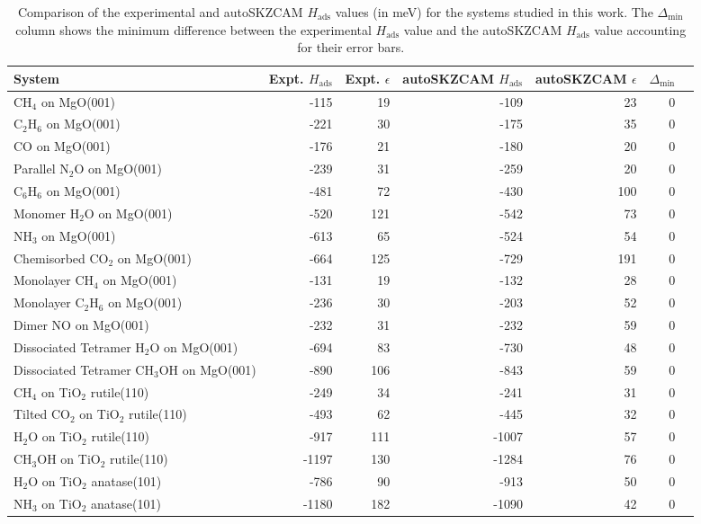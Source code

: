 \begin{table}
\caption{\label{tab:hads_comparison}Comparison of the experimental and autoSKZCAM $H_\text{ads}$ values (in meV) for the systems studied in this work. The $\Delta_\text{min}$ column shows the minimum difference between the experimental $H_\text{ads}$ value and the autoSKZCAM $H_\text{ads}$ value accounting for their error bars.}
\begin{adjustbox}{center,max width=0.9\textwidth}
\begin{tabular}{lrrrrrr}
\toprule
System & Expt. $H_\text{ads}$ & Expt. $\epsilon$ & autoSKZCAM $H_\text{ads}$ & autoSKZCAM $\epsilon$ & $\Delta_\text{min}$ \\ 
\midrule
CH$_4$ on MgO(001) & -115 & 19 & -109 & 23 & 0 \\
C$_2$H$_6$ on MgO(001) & -221 & 30 & -175 & 35 & 0 \\
CO on MgO(001) & -176 & 21 & -180 & 20 & 0 \\
Parallel N$_2$O on MgO(001) & -239 & 31 & -259 & 20 & 0 \\
C$_6$H$_6$ on MgO(001) & -481 & 72 & -430 & 100 & 0 \\
Monomer H$_2$O on MgO(001) & -520 & 121 & -542 & 73 & 0 \\
NH$_3$ on MgO(001) & -613 & 65 & -524 & 54 & 0 \\
Chemisorbed CO$_2$ on MgO(001) & -664 & 125 & -729 & 191 & 0 \\
Monolayer CH$_4$ on MgO(001) & -131 & 19 & -132 & 28 & 0 \\
Monolayer C$_2$H$_6$ on MgO(001) & -236 & 30 & -203 & 52 & 0 \\
Dimer NO on MgO(001) & -232 & 31 & -232 & 59 & 0 \\
Dissociated Tetramer H$_2$O on MgO(001) & -694 & 83 & -730 & 48 & 0 \\
Dissociated Tetramer CH$_3$OH on MgO(001) & -890 & 106 & -843 & 59 & 0 \\
CH$_4$ on TiO$_2$ rutile(110) & -249 & 34 & -241 & 31 & 0 \\
Tilted CO$_2$ on TiO$_2$ rutile(110) & -493 & 62 & -445 & 32 & 0 \\
H$_2$O on TiO$_2$ rutile(110) & -917 & 111 & -1007 & 57 & 0 \\
CH$_3$OH on TiO$_2$ rutile(110) & -1197 & 130 & -1284 & 76 & 0 \\
H$_2$O on TiO$_2$ anatase(101) & -786 & 90 & -913 & 50 & 0 \\
NH$_3$ on TiO$_2$ anatase(101) & -1180 & 182 & -1090 & 42 & 0 \\
\bottomrule
\end{tabular}
\end{adjustbox}
\end{table}
